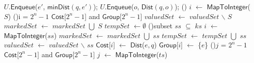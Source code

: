 \documentclass{sig-alternate}
\newcommand{\Dist}{\mbox{$\mathsf{Dist}$}\xspace}
\newcommand{\minDist}{\mbox{$\mathsf{minDist}$}\xspace}
\newcommand{\Cost}{\mbox{$\mathsf{Cost}$}}
\newcommand{\Group}{\mbox{$\mathsf{Group}$}}
\begin{document}
\begin{algorithm}[!h]
{{{{                    
                    {
                       $U$.$\mathsf{Enqueue}$($e'$, $\minDist(q,e')$);
                    }
                }
            }
            {
                {
                    {
                        $U$.$\mathsf{Enqueue}$($o$, $\Dist(q,o)$);
                    }
                }
            }
            \Else()
            {
                {
                    $i$ $\leftarrow$ $\mathsf{MapToInteger}$($S$)\;
                    \If{\Cost$[i]$ $<$ \Dist($q, e$)}
                    {
                        \If(){i = $2^n\!-\!1$}
                        {\Return \Cost[$2^n\!-\!1$] and \Group[$2^n-1$]\;}
                        $valuedSet$ $\leftarrow$ $valuedSet$ $\backslash$ $S$\;
                        $markedSet$ $\leftarrow$ $markedSet$ $\bigcup$ $S$\;
                    }
                }
                $tempSet$ $\leftarrow \emptyset$\;
                \ForEach (){subset $ss$ $\subseteq$ $ks$}
                {
                    {
                        $i$ $\leftarrow$ $\mathsf{MapToInteger}$($ss$)\;
                        $markedSet$ $\leftarrow$ $markedSet$ $\bigcup$ $ss$\;
                        $tempSet$ $\leftarrow$ $tempSet$ $\bigcup$ $ss$\;
                        {
                            $valuedSet$ $\leftarrow$ $valuedSet$ $\backslash$ $ss$\;
                        }
                        \Cost[$i$] $\leftarrow$ \Dist($e, q$)\;
                        \Group[$i$] $\leftarrow$ \{$\mathit{e}$\}\;
                        \If(){$j$ = $2^n-1$}
                        {\Return \Cost[$2^n-1$] and \Group[$2^n-1$]\;}
                    }
                }
                {
                    $j$ $\leftarrow$ $\mathsf{MapToInteger}$($ts$)\;
}}}}
\end{algorithm}
\end{document}
